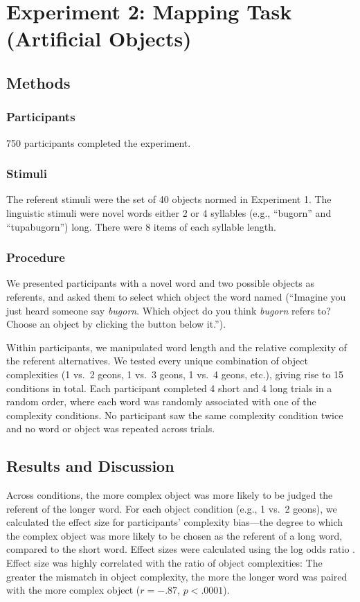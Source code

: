 \documentclass[man]{apa2}
\begin{document}
\section{Experiment 2: Mapping Task (Artificial Objects)}


\subsection{Methods}
\subsubsection{Participants} 750 participants completed the experiment.
\subsubsection{Stimuli}
The referent stimuli were the set of 40 objects normed in Experiment 1. The linguistic stimuli were novel words either 2 or 4 syllables (e.g., ``bugorn'' and ``tupabugorn'') long. There were 8 items of each syllable length.

\subsubsection{Procedure}

We presented participants with a novel word and two possible objects as referents, and asked them to select which object the word named (``Imagine you just heard someone say {\it bugorn}. Which object do you think {\it bugorn} refers to? Choose an object by clicking the button below it.'').

Within participants, we manipulated word length and the relative complexity of the referent alternatives. We tested every unique combination of object complexities (1 vs.\ 2 geons, 1 vs.\ 3 geons, 1 vs.\ 4 geons, etc.), giving rise to 15 conditions in total. Each participant completed 4 short and 4 long trials in a random order, where each word was randomly associated with one of the complexity conditions. No participant saw the same complexity condition twice and no word or object was repeated across trials. 

\subsection{Results and Discussion}
Across conditions, the more complex object was more likely to be judged the referent of the longer word. For each object condition (e.g., 1 vs.\ 2 geons), we calculated the effect size for participants' complexity bias---the degree to which the complex object was more likely to be chosen as the referent of a long word, compared to the short word. Effect sizes were calculated using the log odds ratio \cite{sanchez2003effect}. Effect size was highly correlated with the ratio of object complexities: The greater the mismatch in object complexity, the more the longer word was paired with the more complex object ($r = -.87$, $p < .0001$). 
\end{document}
